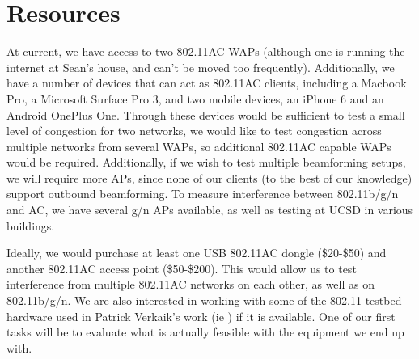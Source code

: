 \section{Resources}

At current, we have access to two 802.11AC WAPs (although one is
running the internet at Sean's house, and can't be moved too
frequently). Additionally, we have a number of devices that can act as
802.11AC clients, including a Macbook Pro, a Microsoft Surface Pro 3,
and two mobile devices, an iPhone 6 and an Android OnePlus
One. Through these devices would be sufficient to test a small level
of congestion for two networks, we would like to test congestion
across multiple networks from several WAPs, so additional 802.11AC
capable WAPs would be required. Additionally, if we wish to test
multiple beamforming setups, we will require more APs, since none of
our clients (to the best of our knowledge) support outbound
beamforming. To measure interference between 802.11b/g/n and AC, we
have several g/n APs available, as well as testing at UCSD in various
buildings.

Ideally, we would purchase at least one USB 802.11AC dongle
(\$20-\$50) and another 802.11AC access point (\$50-\$200). This would
allow us to test interference from multiple 802.11AC networks on each
other, as well as on 802.11b/g/n. We are also interested in working
with some of the 802.11 testbed hardware used in Patrick Verkaik's
work (ie \cite{kandula2009detailed}) if it is available. One of our
first tasks will be to evaluate what is actually feasible with the
equipment we end up with.
